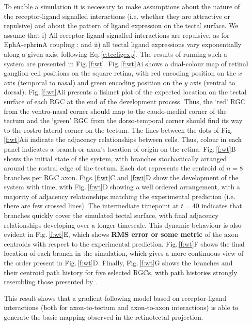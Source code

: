 \documentclass[11pt, a4paper]{article}
\begin{document}
To enable a simulation it is necessary to make assumptions about the nature of
the receptor-ligand signalled interactions (i.e. whether they are attractive
or repulsive) and about the pattern of ligand expression on the tectal
surface. We assume that i) All receptor-ligand signalled interactions are
repulsive, as for EphA-ephrinA
coupling \citep{drescher_vitro_1995,nakamoto_topographically_1996}; and ii)
all tectal ligand expressions vary exponentially along a given axis, following
Eq.\,\ref{e:tecligexp}. The results of running such a system are presented in
Fig.\,\ref{f:wt}.
%
Fig.\,\ref{f:wt}Ai shows a dual-colour map of retinal ganglion cell positions
on the square retina, with red encoding position on the $x$ axis (temporal to
nasal) and green encoding position on the $y$ axis (ventral to
dorsal). Fig.\,\ref{f:wt}Aii presents a fishnet plot of the expected location on
the tectal surface of each RGC at the end of the development process. Thus,
the `red' RGC from the ventro-nasal corner should map to the caudo-medial
corner of the tectum and the `green' RGC from the dorso-temporal corner should
find its way to the rostro-lateral corner on the tectum. The lines between the
dots of Fig.\,\ref{f:wt}Aii indicate the adjacency relationships between
cells. Thus, colour in each panel indicates a branch or axon's location of
origin on the retina.
%
Fig.\,\ref{f:wt}B shows the initial state of the system, with branches
stochastically arranged around the rostral edge of the tectum. Each dot
represents the centroid of $n=8$ branches per RGC axon. Figs.\,\ref{f:wt}C and \ref{f:wt}D
show the development of the system with time, with Fig.\,\ref{f:wt}D showing a
well ordered arrangement, with a majority of adjacency relationships matching
the experimental prediction (i.e. there are few crossed lines). The
intermediate timepoint at $t=40$ indicates that branches quickly cover the simulated
tectal surface, with final adjacency relationships developing over a longer
timescale. This dynamic behaviour is also evident in Fig.\,\ref{f:wt}E, which
shows \textbf{RMS error or some metric} of the axon centroids with respect to
the experimental prediction. Fig.\,\ref{f:wt}F shows the final
location of each branch in the simulation, which gives a more continuous view
of the order present in Fig.\,\ref{f:wt}D. Finally, Fig.\,\ref{f:wt}G shows the
branches and their centroid path history for five selected RGCs, with path
histories strongly resembling those presented by \citet{simpson_simple_2011}.

This result shows that a gradient-following model based on receptor-ligand
interactions (both for axon-to-tectum and axon-to-axon interactions) is
able to generate the basic mapping observed in the retinotectal projection.
\end{document}
